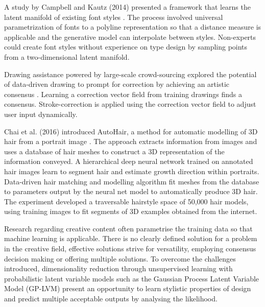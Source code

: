 \documentclass[ %
author={Dillon Keith Diep},
supervisor={Dr. Carl Henrik Ek},
degree={MEng},
title={ART-CG Hair:},
subtitle={Assisted Real-time Content Generation of Stylised Virtual Hair},
type={Research},
year={2017} ]{dissertation}
\begin{document}
A study by Campbell and Kautz (2014) presented a framework that learns the latent manifold of existing font styles \cite{fontmanifold}. The process involved universal parametrization of fonts to a polyline representation so that a distance measure is applicable and the generative model can interpolate between styles. Non-experts could create font styles without experience on type design by sampling points from a two-dimensional latent manifold.

Drawing assistance powered by large-scale crowd-sourcing explored the potential of data-driven drawing to prompt for correction by achieving an artistic consensus \cite{drawingassistance}. Learning a correction vector field from training drawings finds a consensus. Stroke-correction is applied using the correction vector field to adjust user input dynamically.

Chai et al. (2016) introduced AutoHair, a method for automatic modelling of 3D hair from a portrait image \cite{autohair}. The approach extracts information from images and uses a database of hair meshes to construct a 3D representation of the information conveyed. A hierarchical deep neural network trained on annotated hair images learn to segment hair and estimate growth direction within portraits. Data-driven hair matching and modelling algorithm fit meshes from the database to parameters output by the neural net model to automatically produce 3D hair. The experiment developed a traversable hairstyle space of 50,000 hair models, using training images to fit segments of 3D examples obtained from the internet.

Research regarding creative content often parametrise the training data so that machine learning is applicable. There is no clearly defined solution for a problem in the creative field, effective solutions strive for versatility, employing consensus decision making or offering multiple solutions. To overcome the challenges introduced, dimensionality reduction through unsupervised learning with probabilistic latent variable models such as the Gaussian Process Latent Variable Model (GP-LVM) \cite{gplvm} present an opportunity to learn stylistic properties of design and predict multiple acceptable outputs by analysing the likelihood.
\end{document}
